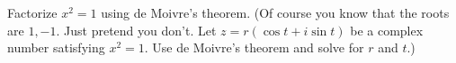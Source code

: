   Factorize $x^2 = 1$ using de Moivre's theorem.
  (Of course you know that the roots are $1, -1$.
  Just pretend you don't.
  Let $z = r (\cos t + i \sin t)$ be a complex
  number satisfying $x^2 = 1$.
  Use de Moivre's theorem and solve for $r$ and $t$.)
